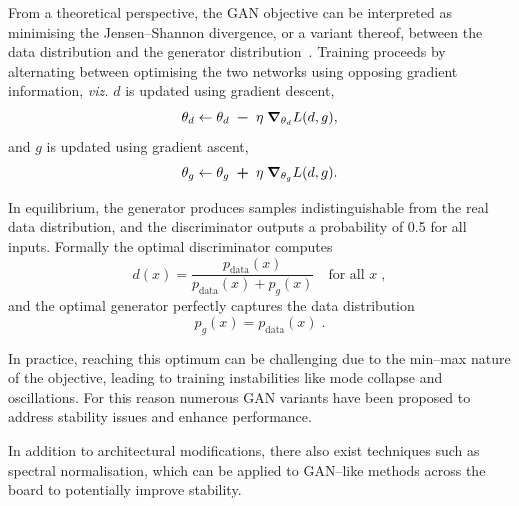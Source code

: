         From a theoretical perspective, the GAN objective can be interpreted as minimising the Jensen--Shannon divergence, or a variant thereof, between the data distribution and the generator distribution~\cite{lin_divergence_1991, nielsen_jensenshannon_2019, manning_foundations_1999, endres_new_2003, Altheimer2012JetBenchmarks, fuglede_jensen-shannon_2004}.
        Training proceeds by alternating between optimising the two networks using opposing gradient information, \textit{viz.} \(d\) is updated using gradient descent,
        \begin{equation}
            \theta_d \leftarrow \theta_d \;\vb*{-}\; \eta \;\grad_{\theta_d} L(d, g),
        \end{equation}
        and \(g\) is updated using gradient ascent,
        \begin{equation}
            \theta_g \leftarrow \theta_g \;\vb*{+}\; \eta\; \grad_{\theta_g} L(d, g).
        \end{equation}
        
        In equilibrium, the generator produces samples indistinguishable from the real data distribution, and the discriminator outputs a probability of 0.5 for all inputs.
        Formally the optimal discriminator computes
        \begin{equation}
            d(x) = \frac{p_{\text{data}}(x)}{p_{\text{data}}(x) + p_g(x)}\quad\text{for all } x\;,
        \end{equation}
        and the optimal generator perfectly captures the data distribution
        \begin{equation}
            p_g(x) = p_{\text{data}}(x)\;.
        \end{equation}
        
        In practice, reaching this optimum can be challenging due to the min--max nature of the objective, leading to training instabilities like mode collapse and oscillations.
        For this reason numerous GAN variants have been proposed to address stability issues and enhance performance.
        
        In addition to architectural modifications, there also exist techniques such as spectral normalisation, which can be applied to GAN--like methods across the board to potentially improve stability.


